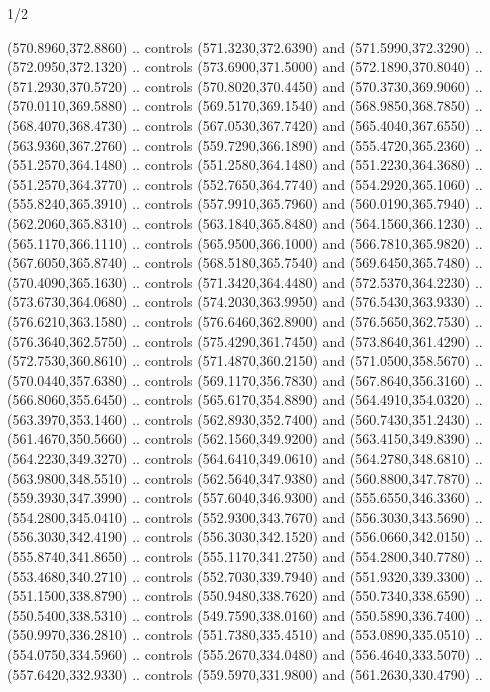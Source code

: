 \begin{flagdescription}{1/2}
\begin{scope}[xshift=0.5\flaglength,yshift=0.5\flagwidth,scale=\flagwidth/759]
\begin{scope}[y=0.8pt, x=0.8pt, yscale=-1,shift={(-720,-480)}]
\begin{scope}[cm={{1.14637,0.0,0.0,1.17117,(33.17849,82.1384)}}]
  (570.8960,372.8860) .. controls (571.3230,372.6390) and (571.5990,372.3290) ..
  (572.0950,372.1320) .. controls (573.6900,371.5000) and (572.1890,370.8040) ..
  (571.2930,370.5720) .. controls (570.8020,370.4450) and (570.3730,369.9060) ..
  (570.0110,369.5880) .. controls (569.5170,369.1540) and (568.9850,368.7850) ..
  (568.4070,368.4730) .. controls (567.0530,367.7420) and (565.4040,367.6550) ..
  (563.9360,367.2760) .. controls (559.7290,366.1890) and (555.4720,365.2360) ..
  (551.2570,364.1480) .. controls (551.2580,364.1480) and (551.2230,364.3680) ..
  (551.2570,364.3770) .. controls (552.7650,364.7740) and (554.2920,365.1060) ..
  (555.8240,365.3910) .. controls (557.9910,365.7960) and (560.0190,365.7940) ..
  (562.2060,365.8310) .. controls (563.1840,365.8480) and (564.1560,366.1230) ..
  (565.1170,366.1110) .. controls (565.9500,366.1000) and (566.7810,365.9820) ..
  (567.6050,365.8740) .. controls (568.5180,365.7540) and (569.6450,365.7480) ..
  (570.4090,365.1630) .. controls (571.3420,364.4480) and (572.5370,364.2230) ..
  (573.6730,364.0680) .. controls (574.2030,363.9950) and (576.5430,363.9330) ..
  (576.6210,363.1580) .. controls (576.6460,362.8900) and (576.5650,362.7530) ..
  (576.3640,362.5750) .. controls (575.4290,361.7450) and (573.8640,361.4290) ..
  (572.7530,360.8610) .. controls (571.4870,360.2150) and (571.0500,358.5670) ..
  (570.0440,357.6380) .. controls (569.1170,356.7830) and (567.8640,356.3160) ..
  (566.8060,355.6450) .. controls (565.6170,354.8890) and (564.4910,354.0320) ..
  (563.3970,353.1460) .. controls (562.8930,352.7400) and (560.7430,351.2430) ..
  (561.4670,350.5660) .. controls (562.1560,349.9200) and (563.4150,349.8390) ..
  (564.2230,349.3270) .. controls (564.6410,349.0610) and (564.2780,348.6810) ..
  (563.9800,348.5510) .. controls (562.5640,347.9380) and (560.8800,347.7870) ..
  (559.3930,347.3990) .. controls (557.6040,346.9300) and (555.6550,346.3360) ..
  (554.2800,345.0410) .. controls (552.9300,343.7670) and (556.3030,343.5690) ..
  (556.3030,342.4190) .. controls (556.3030,342.1520) and (556.0660,342.0150) ..
  (555.8740,341.8650) .. controls (555.1170,341.2750) and (554.2800,340.7780) ..
  (553.4680,340.2710) .. controls (552.7030,339.7940) and (551.9320,339.3300) ..
  (551.1500,338.8790) .. controls (550.9480,338.7620) and (550.7340,338.6590) ..
  (550.5400,338.5310) .. controls (549.7590,338.0160) and (550.5890,336.7400) ..
  (550.9970,336.2810) .. controls (551.7380,335.4510) and (553.0890,335.0510) ..
  (554.0750,334.5960) .. controls (555.2670,334.0480) and (556.4640,333.5070) ..
  (557.6420,332.9330) .. controls (559.5970,331.9800) and (561.2630,330.4790) ..

\end{scope}
\end{scope}
\end{scope}
\end{flagdescription}
